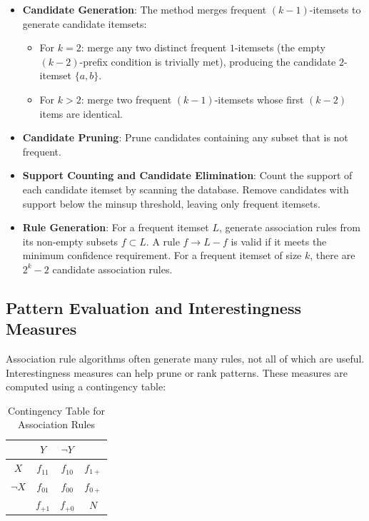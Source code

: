 \begin{itemize}
    \item \textbf{Candidate Generation}: The method merges frequent $(k-1)$-itemsets to generate candidate itemsets:
    \begin{itemize}
        \item For $k=2$: merge any two distinct frequent $1$-itemsets (the empty $(k-2)$-prefix condition is trivially met), producing the candidate $2$-itemset $\{a,b\}$.
        \item For $k > 2$: merge two frequent $(k-1)$-itemsets whose first $(k-2)$ items are identical.
    \end{itemize}

    \item \textbf{Candidate Pruning}: Prune candidates containing any subset that is not frequent.

    \item \textbf{Support Counting and Candidate Elimination}: Count the support of each candidate itemset by scanning the database. Remove candidates with support below the minsup threshold, leaving only frequent itemsets.

    \item \textbf{Rule Generation}: For a frequent itemset $L$, generate association rules from its non-empty subsets $f \subset L$. A rule $f \rightarrow L - f$ is valid if it meets the minimum confidence requirement. For a frequent itemset of size $k$, there are $2^k - 2$ candidate association rules.
\end{itemize}

\subsection{Pattern Evaluation and Interestingness Measures}

Association rule algorithms often generate many rules, not all of which are useful. Interestingness measures can help prune or rank patterns. These measures are computed using a contingency table:

\begin{table}[h!]
\centering
\begin{tabular}{|c|c|c|c|}
\hline
 & $Y$ & $\neg Y$ & \\
\hline
$X$ & $f_{11}$ & $f_{10}$ & $f_{1+}$ \\
\hline
$\neg X$ & $f_{01}$ & $f_{00}$ & $f_{0+}$ \\
\hline
 & $f_{+1}$ & $f_{+0}$ & $N$ \\
\hline
\end{tabular}
\caption{Contingency Table for Association Rules}
\end{table}

